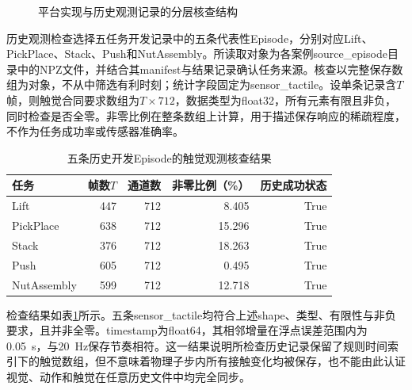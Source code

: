 \begin{figure}[htbp]
  \centering
  \caption{平台实现与历史观测记录的分层核查结构}
  \label{fig:ch02_validation}
\end{figure}

历史观测检查选择五任务开发记录中的五条代表性Episode，分别对应Lift、PickPlace、Stack、Push和NutAssembly。所读取对象为各案例source\_episode目录中的NPZ文件，并结合其manifest与结果记录确认任务来源。核查以完整保存数组为对象，不从中筛选有利时刻；统计字段固定为sensor\_tactile。设单条记录含$T$帧，则触觉合同要求数组为$T\times712$，数据类型为float32，所有元素有限且非负，同时检查是否全零。非零比例在整条数组上计算，用于描述保存响应的稀疏程度，不作为任务成功率或传感器准确率。

\begin{table}[htbp]
  \centering\small
  \caption{五条历史开发Episode的触觉观测核查结果}
  \label{tab:ch02_episode_validation}
  \begin{tabular}{lrrrr}
    \hline
    任务 & 帧数$T$ & 通道数 & 非零比例（\%） & 历史成功状态\\
    \hline
    Lift & 447 & 712 & 8.405 & True\\
    PickPlace & 638 & 712 & 15.296 & True\\
    Stack & 376 & 712 & 18.263 & True\\
    Push & 605 & 712 & 0.495 & True\\
    NutAssembly & 599 & 712 & 12.718 & True\\
    \hline
  \end{tabular}
\end{table}

检查结果如表\ref{tab:ch02_episode_validation}所示。五条sensor\_tactile均符合上述shape、类型、有限性与非负要求，且并非全零。timestamp为float64，其相邻增量在浮点误差范围内为0.05~s，与20~Hz保存节奏相符。这一结果说明所检查历史记录保留了规则时间索引下的触觉数组，但不意味着物理子步内所有接触变化均被保存，也不能由此认证视觉、动作和触觉在任意历史文件中均完全同步。

